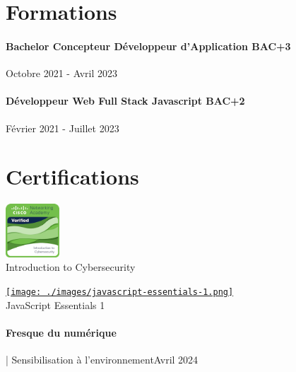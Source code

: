 \documentclass{article}
\begin{document}
\vspace{2ex}
\hrulefill
\section*{Formations}
\paragraph{Bachelor Concepteur Développeur d’Application BAC+3}\hspace*{\fill}Octobre 2021 - Avril 2023

\paragraph{Développeur Web Full Stack Javascript BAC+2}\hspace*{\fill}Février 2021 - Juillet 2023

\vspace{2ex}
\hrulefill
\section*{Certifications}

\noindent
\begin{minipage}[t]{0.45\textwidth}
    \centering
    \href{https://www.credly.com/badges/6cc7444d-a897-46e0-880c-aae24bd23910}{\includegraphics[width=0.15\textwidth]{./images/introduction-to-cybersecurity.png}}
    \\
    Introduction to Cybersecurity
\end{minipage}
\hfill
\begin{minipage}[t]{0.45\textwidth}
    \centering
    \href{https://www.credly.com/badges/47bf9849-07c5-4995-a7fc-6826700dff6e/public_url}{\texttt{[image: ./images/javascript-essentials-1.png]}}
    \\
    JavaScript Essentials 1
\end{minipage}

\noindent
\paragraph{Fresque du numérique} | Sensibilisation à l’environnement\hspace*{\fill}Avril 2024
\end{document}

